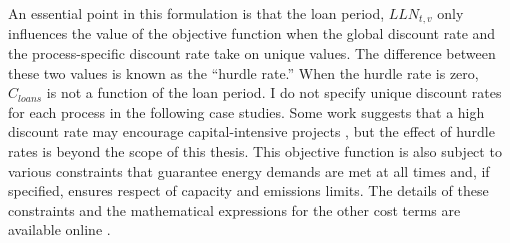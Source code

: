 An essential point in this formulation is that the loan period, $LLN_{t,v}$ only
influences the value of the objective function when the global discount rate
and the process-specific discount rate take on unique values. The difference between
these two values is known as the ``hurdle rate.'' When the hurdle rate is zero,
$C_{loans}$ is not a function of the loan period. I
do not specify unique discount rates for each process in the following case studies.
Some work suggests that a high discount rate may encourage capital-intensive projects \cite{alzbutas_uncertainty_2012,
decarolis_modelling_2016}, but the effect of hurdle rates is beyond the scope of
this thesis. This objective function is also subject to various constraints that
guarantee energy demands are met at all times and, if specified, ensures respect
of capacity and emissions limits. The details of these constraints and the
mathematical expressions for the other cost terms are available online
\cite{noauthor_preface_nodate}.

